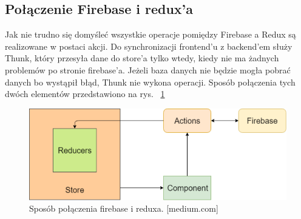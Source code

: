 \subsection{Połączenie Firebase i redux’a}

Jak nie trudno się domyśleć wszystkie operacje pomiędzy Firebase a Redux są realizowane w postaci akcji.
Do synchronizacji frontend’u z backend’em służy Thunk,
który przesyła dane do store’a tylko wtedy,
kiedy nie ma żadnych problemów po stronie firebase’a.
Jeżeli baza danych nie będzie mogła pobrać danych bo wystąpił błąd,
Thunk nie wykona operacji. Sposób połączenia tych dwóch elementów przedstawiono na rys. 
~\ref{rys:fireRedux} 

\begin{figure}
	\centering\includegraphics[width=.6\textwidth]{img/fireRedux}
	\caption{Sposób połączenia firebase i reduxa. [medium.com]}\label{rys:fireRedux}%
\end{figure}
